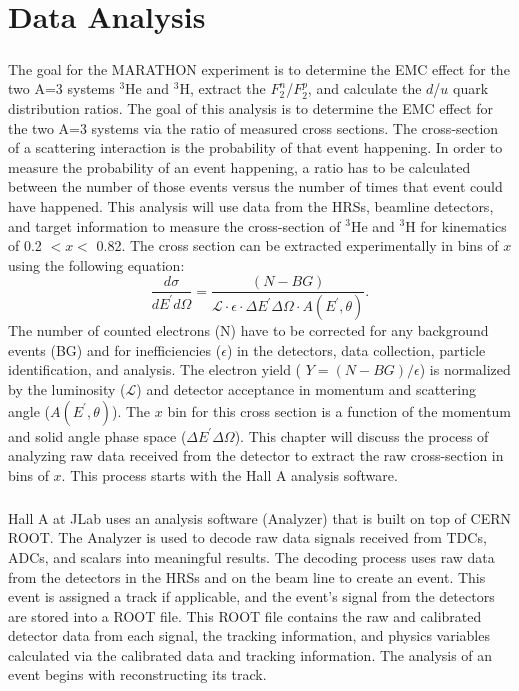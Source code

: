 	\chapter{Data Analysis}
\paragraph{}The goal for the MARATHON experiment is to determine the EMC effect for the two A=3 systems $^3$He and $^3$H, extract the  $F_2^n$/$F_2^p$, and calculate the $d$/$u$ quark distribution ratios. The goal of this analysis is to determine the EMC effect for the two A=3 systems via the ratio of measured cross sections. The cross-section of a scattering interaction is the probability of that event happening. In order to measure the probability of an event happening, a ratio has to be calculated between the number of those events versus the number of times that event could have happened. This analysis will use data from the HRSs, beamline detectors, and target information to measure the cross-section of $^3$He and $^3$H for kinematics of 0.2 $< x <$ 0.82. The cross section can be extracted experimentally in bins of $x$ using the following equation:
\begin{equation}
\dfrac{d\sigma}{dE^{\prime}d\Omega} = \frac{(N - BG)}{\mathscr{L} \cdot \epsilon \cdot \Delta E^{\prime} \Delta \Omega \cdot A(E^{\prime},\theta)}. \label{expcc}
\end{equation}
The number of counted electrons (N) have to be corrected for any background events (BG) and for inefficiencies ($\epsilon$) in the detectors, data collection, particle identification, and analysis. The electron yield ( $Y=(N-BG)/\epsilon$) is normalized by the luminosity ($\mathscr{L}$) and detector acceptance in momentum and scattering angle ($A(E^{\prime},\theta)$). The $x$ bin for this cross section is a function of the momentum and solid angle phase space ($\Delta E^{\prime} \Delta \Omega$). This chapter will discuss the process of analyzing raw data received from the detector to extract the raw cross-section in bins of $x$. This process starts with the Hall A analysis software.  
\paragraph{}Hall A at JLab uses an analysis software (Analyzer) that is built on top of CERN ROOT. The Analyzer is used to decode raw data signals received from TDCs, ADCs, and scalars into meaningful results. The decoding process uses raw data from the detectors in the HRSs and on the beam line to create an event. This event is assigned a track if applicable, and the event's signal from the detectors are stored into a ROOT file. This ROOT file contains the raw and calibrated detector data from each signal, the tracking information, and physics variables calculated via the calibrated data and tracking information. The analysis of an event begins with reconstructing its track. 
